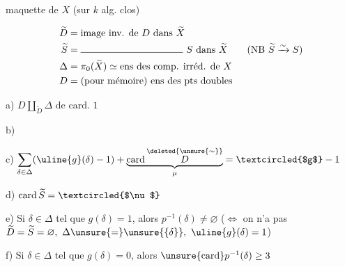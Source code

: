 
maquette de $X$ (sur $k$ alg. clos)

\[
\begin{aligned}
\widetilde D&=\text{image inv. de }D\text{ dans }\widetilde X\\
\widetilde S&=\rule{3.7cm}{.4pt}\ S\text{ dans }\widetilde X
\qquad(\text{NB }\widetilde S\xrightarrow{\sim}S)\\
\Delta&=\pi_0(\widetilde X)\simeq\text{ens des comp. irréd. de }X\\
D&=(\text{pour mémoire})\text{ ens des pts doubles}
\end{aligned}
\]


a) $D\amalg_{\widetilde D}\Delta$ de card. $1$

b) 

c) $\displaystyle\sum_{\delta\in\Delta}(\uline{g}(\delta)-1)
+\underbrace{\operatorname{card}\overset{\deleted{\unsure{\sim}}}{D}}_{\mu}
=\textcircled{$g$}-1$

d) $\operatorname{card}\widetilde S=\textcircled{$\nu$}$

e) Si $\delta\in\Delta$ tel que $g(\delta)=1$, alors
$p^{-1}(\delta)\neq\varnothing$
($\Longleftrightarrow$ on n'a pas
$\widetilde D=\widetilde S=\varnothing,\ \Delta\unsure{=}\unsure{\{\delta\}},
\ \uline{g}(\delta)=1$)

f) Si $\delta\in\Delta$ tel que $g(\delta)=0$, alors
$\unsure{\operatorname{card}}p^{-1}(\delta)\geq3$

